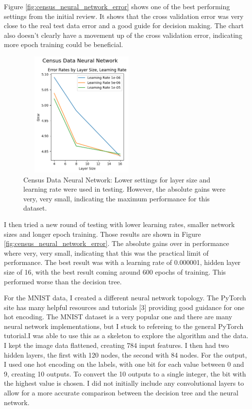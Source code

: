 \documentclass[letterpaper]{article} %
\begin{document}
Figure \ref{fig:census_neural_network_error} shows one of the best performing settings from the initial review.  It shows that the cross validation error was very close to the real test data error and a good guide for decision making.  The chart also doesn't clearly have a movement up of the cross validation error, indicating more epoch training could be beneficial.

\begin{figure}[h]
\centering
\includegraphics[width=2.5in, height=2.5in]{figures/Census_Data_Neural_Network_Error_Rates_by_Layer_Size__Learning_Rate_census_v2.png}
\caption{Census Data Neural Network:   Lower settings for layer size and learning rate were used in testing.   However, the absolute gains were very, very small, indicating the maximum performance for this dataset.   }
\label{fig:census_neural_network_v2}
\end{figure}

I then tried a new round of testing with lower learning rates, smaller network sizes and longer epoch training.  Those results are shown in Figure \ref{fig:census_neural_network_error}.  The absolute gains over in performance where very, very small, indicating that this was the practical limit of performance.  The best result was with a learning rate of 0.000001, hidden layer size of 16, with the best result coming around 600 epochs of training.  This performed worse than the decision tree. 

For the MNIST data, I created a different neural network topology.  The PyTorch site has many helpful resources and tutorials [3] providing good guidance for one hot encoding.  The MNIST dataset is a very popular one and there are many neural network implementations, but I stuck to refereing to the general PyTorch tutorial.I was able to use this as a skeleton to explore the algorithm and the data. I kept the image data flattened, creating 784 input features.  I then had two hidden layers, the first with 120 nodes, the second with 84 nodes.  For the output, I used one hot encoding on the labels, with one bit for each value between 0 and 9, creating 10 outputs.  To convert the 10 outputs to a single integer, the bit with the highest value is chosen.  I did not initially include any convolutional layers to allow for a more accurate comparison between the decision tree and the neural network.
\end{document}
